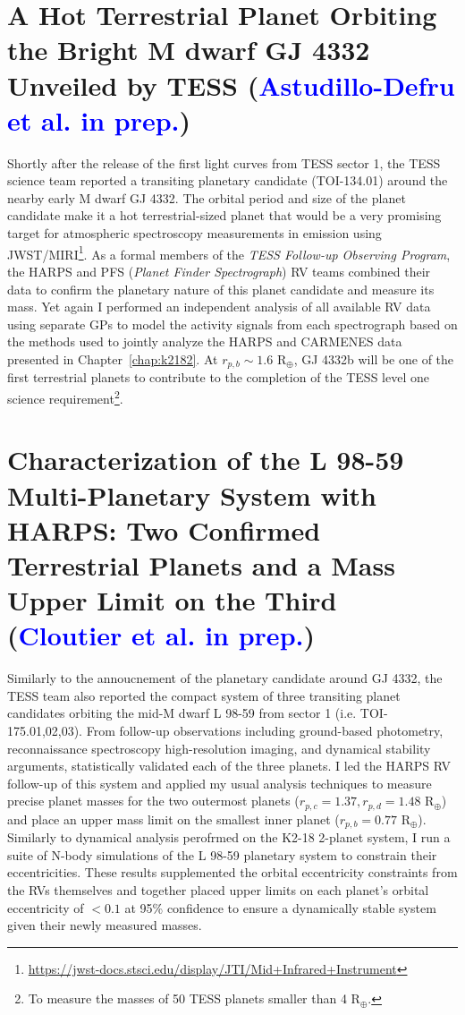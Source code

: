 \section{A Hot Terrestrial Planet Orbiting the Bright M dwarf GJ 4332 Unveiled
  by TESS (\textcolor{blue}{Astudillo-Defru et al. in prep.})}
Shortly after the release of the first light curves from TESS sector 1, the
TESS science team reported a transiting planetary candidate (TOI-134.01)
around the nearby early M dwarf GJ 4332.
The orbital period and size of the planet candidate make it a hot
terrestrial-sized planet that would be a very promising target for atmospheric
spectroscopy measurements in emission using JWST/MIRI\footnote{\url{https://jwst-docs.stsci.edu/display/JTI/Mid+Infrared+Instrument}}. As a formal members of
the \emph{TESS Follow-up Observing Program}, the HARPS and PFS
(\emph{Planet Finder Spectrograph}) RV teams combined their data to confirm the
planetary nature of this planet candidate and measure its mass. Yet again I
performed an independent analysis of all available RV data using separate GPs
to model the activity signals from each spectrograph based on the methods used
to jointly analyze the HARPS and CARMENES data presented in
Chapter~\ref{chap:k2182}. At $r_{p,b}\sim 1.6$ R$_{\oplus}$, GJ 4332b will be one
of the first terrestrial planets to contribute to the completion of the TESS
level one science requirement\footnote{To measure the masses of 50 TESS planets
  smaller than 4 R$_{\oplus}$.}.


\section{Characterization of the L 98-59 Multi-Planetary System with HARPS:
  Two Confirmed Terrestrial Planets and a Mass Upper Limit on the Third
  (\textcolor{blue}{Cloutier et al. in prep.})}
Similarly to the annoucnement of the planetary candidate around GJ 4332, the
TESS team also reported the compact system of three transiting planet
candidates orbiting the mid-M dwarf L 98-59 from sector 1 (i.e.
TOI-175.01,02,03). From follow-up observations including ground-based
photometry, reconnaissance spectroscopy high-resolution imaging, and
dynamical stability arguments, \cite{kostov19} statistically validated each of
the three planets. I led the HARPS RV follow-up of this system and applied my
usual analysis techniques to measure precise planet masses for the two outermost
planets ($r_{p,c}=1.37, r_{p,d}=1.48$ R$_{\oplus}$) and place an upper mass limit
on the smallest inner planet ($r_{p,b}=0.77$ R$_{\oplus}$). \\

Similarly to dynamical analysis perofrmed on the K2-18 2-planet system, I
run a suite of N-body simulations of the L 98-59 planetary system to constrain
their eccentricities. These results supplemented the orbital eccentricity
constraints from the RVs themselves and together placed upper limits on each
planet's orbital eccentricity of $< 0.1$ at 95\% confidence to ensure a
dynamically stable system given their newly measured masses.

